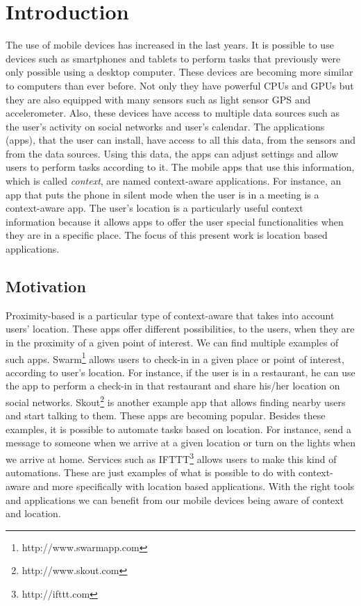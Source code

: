 
\chapter{Introduction}
\label{chapter:introduction}
The use of mobile devices has increased in the last years.
It is possible to use devices such as smartphones and tablets to perform tasks that previously were only possible using a desktop computer.
These devices are becoming more similar to computers than ever before.
Not only they have powerful \glspl{CPU} and \glspl{GPU} but they are also equipped with many sensors such as light sensor \gls{GPS} and accelerometer.
Also, these devices have access to multiple data sources such as
the user's activity on social networks and user's calendar.
The applications (apps), that the user can install, have access to all this data, from the sensors and from the data sources.
Using this data, the apps can adjust settings and allow users to perform tasks according to it.
The mobile apps that use this information, which is called \emph{context}, are named context-aware applications.
For instance, an app that puts the phone in silent mode when the user is in a meeting is a context-aware app.
The user's location is a particularly useful context information because it allows apps to offer the user special functionalities when they are in a specific place.
The focus of this present work is location based applications.

\section{Motivation}
\label{sec:introduction_motivation}
Proximity-based is a particular type of context-aware that takes into account users' location.
These apps offer different possibilities, to the users, when they are in the proximity of a given point of interest.
We can find multiple examples of such apps.
Swarm\footnote{http://www.swarmapp.com} allows users to check-in in a given place or point of interest, according to user's location.
For instance, if the user is in a restaurant, he can use the app to perform a check-in in that restaurant and share his/her location on social networks.
Skout\footnote{http://www.skout.com}
is another example app that allows finding nearby users and start talking to them.
These apps are becoming popular.
Besides these examples, it is possible to automate tasks based on location.
For instance, send a message to someone when we arrive at a given location or turn on the lights when we arrive at home.
Services such as \gls{IFTTT}\footnote{http://ifttt.com} allows users to make this kind of automations.
These are just examples of what is possible to do with context-aware and more specifically with location based applications.
With the right tools and applications we can benefit from our mobile devices being aware of context and location.

